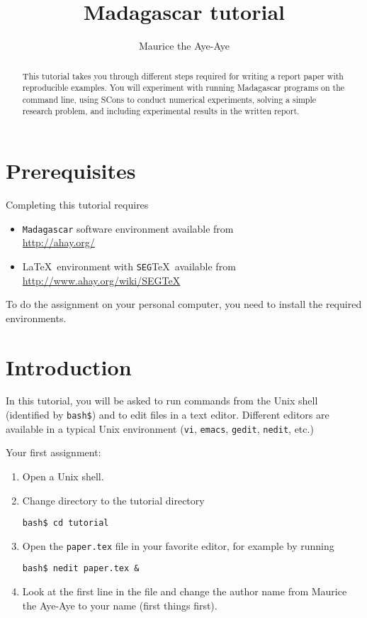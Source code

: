 \author{Maurice the Aye-Aye}
\title{Madagascar tutorial}


\begin{abstract}  
This tutorial takes you through different steps required for writing a report paper with reproducible examples. You will experiment with running Madagascar programs on the command line, using SCons to conduct numerical experiments, solving a simple research problem, and including experimental results in the written report. 
\end{abstract}

\section{Prerequisites}

Completing this tutorial requires
\begin{itemize}
\item \texttt{Madagascar} software environment available from \\
\url{http://ahay.org/}
\item \LaTeX\ environment with \texttt{SEG}\TeX\ available from \\ 
\url{http://www.ahay.org/wiki/SEGTeX}
\end{itemize}
To do the assignment on your personal computer, you need to install
the required environments. 

\section{Introduction}

In this tutorial, you will be asked to run commands from the Unix
shell (identified by \texttt{bash\$}) and to edit files in a text
editor. Different editors are available in a typical Unix environment
(\texttt{vi}, \texttt{emacs}, \texttt{gedit}, \texttt{nedit}, etc.)

Your first assignment:
\begin{enumerate}
\item Open a Unix shell.
\item Change directory to the tutorial directory
\begin{verbatim}
bash$ cd tutorial
\end{verbatim}
\item Open the \texttt{paper.tex} file in your favorite editor, for example by
running
\begin{verbatim}
bash$ nedit paper.tex & 
\end{verbatim}
\item Look at the first line in the file and change the author name from Maurice the Aye-Aye to your name (first things first). 
\end{enumerate}

